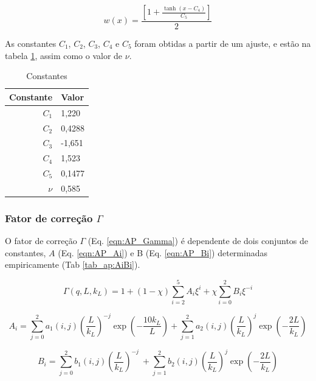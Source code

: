 \begin{apendicesenv}
\begin{equation}
w(x) = \frac{\left[1 + \frac{\tanh(x-C_4)}{C_5}\right]}{2}
\label{eqn:AP_w}
\end{equation}

As constantes \(C_1\), \(C_2\), \(C_3\), \(C_4\) e \(C_5\) foram obtidas a partir de um ajuste, e estão na tabela \ref{tab_ap:C1C5}, assim como o valor de \(\nu\).
\begin{table}
    \IBGEtab%
    {\caption{Constantes}
    \label{tab_ap:C1C5} }%
    {\begin{tabular}{r p{2cm}}
      \toprule
      Constante 	& Valor \\
      \midrule
      \(C_1\)			&  1,220	\\
      \(C_2\)			&  0,4288	\\
      \(C_3\)			&  -1,651	\\
      \(C_4\)			&  1,523	\\
      \(C_5\)			&  0,1477 	\\	
      \(\nu\)			&  0,585	\\					
      \bottomrule
    \end{tabular}}%
    {}%
\end{table}


\subsubsection{Fator de correção \(\Gamma\)}

O fator de correção \(\Gamma\) (Eq. \ref{eqn:AP_Gamma}) é dependente de dois conjuntos de constantes, \(A\) (Eq. \ref{eqn:AP_Ai}) e B (Eq. \ref{eqn:AP_Bi}) determinadas empiricamente (Tab \ref{tab_ap:AiBi}).

\begin{equation}
\Gamma\left( q,L,k_{L} \right) = 1 + \left( 1 - \chi \right)\sum_{i = 2}^{5}{A_{i}\xi^{i}} + \chi\sum_{i = 0}^{2}{B_{i}\xi^{- i}}
\label{eqn:AP_Gamma}
\end{equation}

\begin{equation}
A_{i} = \sum_{j = 0}^{2}{a_{1}\left( i,j \right)\left( \frac{L}{k_{L}} \right)^{- j}\exp\left( - \frac{10k_{L}}{L} \right)} + \sum_{j = 1}^{2}{a_{2}\left( i,j \right)\left( \frac{L}{k_{L}} \right)^{j}\exp\left( - \frac{2L}{k_{L}} \right)}
\label{eqn:AP_Ai}
\end{equation}

\begin{equation}
B_{i} = \sum_{j = 0}^{2}{b_{1}\left( i,j \right)\left( \frac{L}{k_{L}} \right)^{- j}\ } + \sum_{j = 1}^{2}{b_{2}\left( i,j \right)\left( \frac{L}{k_{L}} \right)^{j}\exp\left( - \frac{2L}{k_{L}} \right)}
\label{eqn:AP_Bi}
\end{equation}


\end{apendicesenv}
